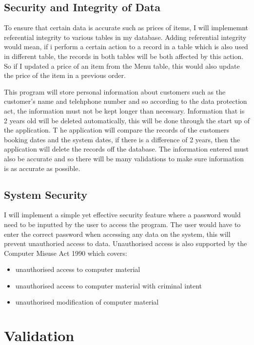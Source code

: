 \subsection{Security and Integrity of Data}
To ensure that certain data is accurate such as prices of items, I will implememnt referential integrity to various tables in my database. Adding referential integrity would mean, if i perform a certain action to a record in a table which is also used in different table, the records in both tables will be both affected by this action. So if I updated a price of an item from the Menu table, this would also update the price of the item in a previous order.

This program will store personal information about customers such as the customer's name and telehphone number and so according to the data protection act, the information must not be kept longer than necessary. Information that is 2 years old will be deleted automatically, this will be done through the start up of the application. T he application will compare the records of the customers booking dates and the system dates, if there is a difference of 2 years, then the application will delete the records off the database. The information entered must also be accurate and so there will be many validations to make sure information is as accurate as possible.

\subsection{System Security}

I will implement a simple yet effective security feature where a password would need to be inputted by the user to access the program. The user would have to enter the correct password when accessing any data on the system, this will prevent unauthoried access to data. Unauthorised access is also supported by the Computer Misuse Act 1990 which covers: \\

\begin{itemize}
	\item unauthorised access to computer material
	\item unauthorised access to computer material with criminal intent
	\item unauthorised modification of computer material
\end{itemize}

\section{Validation}

